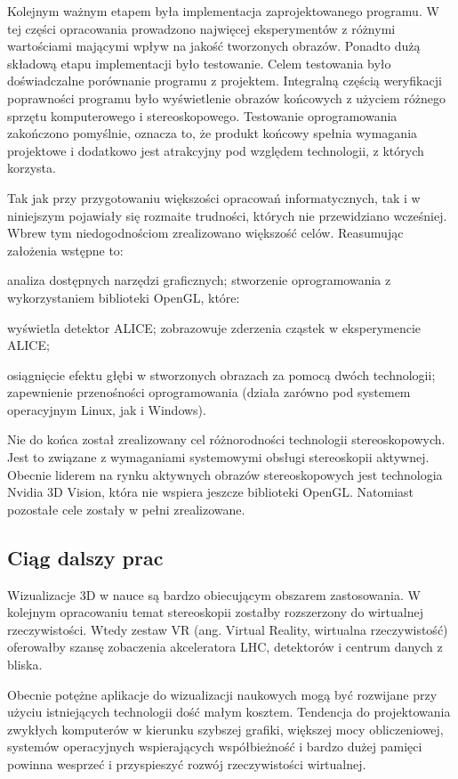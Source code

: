Kolejnym ważnym etapem była implementacja zaprojektowanego programu. W tej części opracowania prowadzono najwięcej eksperymentów z różnymi wartościami mającymi wpływ na jakość tworzonych obrazów. Ponadto dużą składową etapu implementacji było testowanie. Celem testowania było doświadczalne porównanie programu z projektem. Integralną częścią weryfikacji poprawności programu było wyświetlenie obrazów końcowych z użyciem różnego sprzętu komputerowego i stereoskopowego. Testowanie oprogramowania zakończono pomyślnie, oznacza to, że produkt końcowy spełnia wymagania projektowe i dodatkowo jest atrakcyjny pod względem technologii, z których korzysta.

Tak jak przy przygotowaniu większości opracowań informatycznych, tak i w niniejszym pojawiały się rozmaite trudności, których nie przewidziano wcześniej. Wbrew tym niedogodnościom zrealizowano większość celów. Reasumując założenia wstępne to:
\begin{itemize}
\itemi analiza dostępnych narzędzi graficznych;
\itemi stworzenie oprogramowania z wykorzystaniem biblioteki OpenGL, które:
\begin{itemize}
\itemii wyświetla detektor ALICE;
\itemii zobrazowuje zderzenia cząstek w eksperymencie ALICE;
\end{itemize}
\itemi osiągnięcie efektu głębi w stworzonych obrazach za pomocą dwóch technologii;
\itemi zapewnienie przenośności oprogramowania (działa zarówno pod systemem operacyjnym Linux, jak i Windows).
\end{itemize}

Nie do końca został zrealizowany cel różnorodności technologii stereoskopowych. Jest to związane z wymaganiami systemowymi obsługi stereoskopii aktywnej. Obecnie liderem na rynku aktywnych obrazów stereoskopowych jest technologia Nvidia 3D Vision, która nie wspiera jeszcze biblioteki OpenGL. Natomiast pozostałe cele zostały w pełni zrealizowane. 

\subsection{Ciąg dalszy prac}
Wizualizacje 3D w nauce są bardzo obiecującym obszarem zastosowania. W kolejnym opracowaniu temat stereoskopii zostałby rozszerzony do wirtualnej rzeczywistości. Wtedy zestaw VR (ang. Virtual Reality, wirtualna rzeczywistość) oferowałby szansę zobaczenia akceleratora LHC, detektorów i centrum danych z bliska.

Obecnie potężne aplikacje do wizualizacji naukowych mogą być rozwijane przy użyciu istniejących technologii dość małym kosztem. Tendencja do projektowania zwykłych komputerów w kierunku szybszej grafiki, większej mocy obliczeniowej, systemów operacyjnych wspierających współbieżność i bardzo dużej pamięci powinna wesprzeć i przyspieszyć rozwój rzeczywistości wirtualnej.

